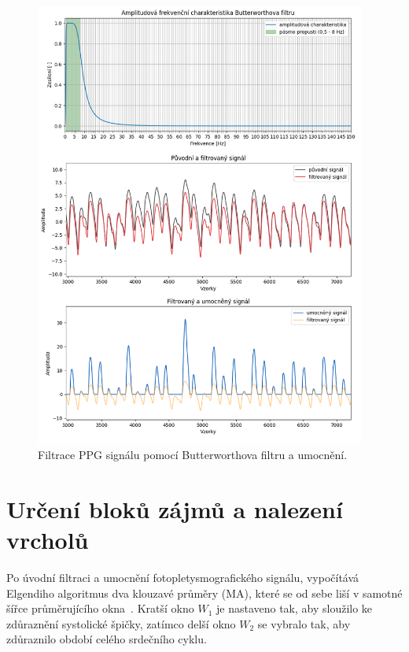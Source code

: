 \begin{figure}[h]
	\centering
	\includegraphics[width=0.97\textwidth]{./obrazky/ElgendiAFC_PP_Sq.png}
	\vspace{-9mm}
	\caption[Elgendiho předzpracování PPG signálu]{Filtrace PPG signálu pomocí Butterworthova filtru a umocnění.}
	\vspace{-15mm}
	\label{fig:filter-example}
\end{figure}

\section{Určení bloků zájmů a nalezení vrcholů}
\label{sec:thr_peaks}

Po úvodní filtraci a umocnění fotopletysmografického signálu, vypočítává Elgendiho algoritmus dva klouzavé průměry (\acs{MA}), které se od sebe liší v samotné šířce průměrujícího okna~\cite{Elgendi2013}.
Kratší okno \(W_1\) je nastaveno tak, aby sloužilo ke zdůraznění systolické špičky, zatímco delší okno \(W_2\) se vybralo tak, aby zdůraznilo období celého srdečního cyklu.

